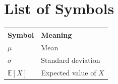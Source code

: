 \chapter*{List of Symbols}

\setlength{\LTleft}{0pt}          %
\begin{longtable}{@{}p{3cm}l@{}}
  \toprule
  Symbol & Meaning \\
  \midrule
  \endhead
  $\mu$       & Mean \\
  $\sigma$    & Standard deviation \\
  $\mathbb{E}[X]$ & Expected value of $X$ \\
  \bottomrule
\end{longtable}